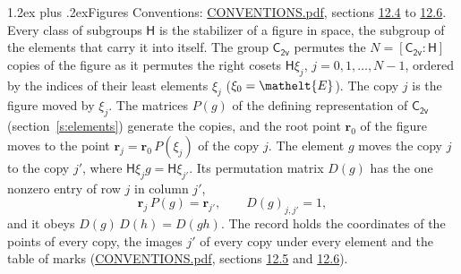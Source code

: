 \documentclass[10pt,a4paper]{article}
\makeatletter
\renewcommand\section{\@startsection{section}{1}{\z@}{-3ex plus -1ex minus -.2ex}%
  {1.2ex plus .2ex}{\normalfont\large\sffamily\bfseries\color{parttitle}}}
\numberwithin{equation}{section}
\newcommand{\eltfont}[1]{{\let\sigma\eltsigma\mathelt{#1}}}
\newcommand{\grp}[1]{\mathsf{#1}}
\newcommand{\cls}[1]{\eltfont{#1}}
\newcommand{\pointr}{\mathbf{r}}
\makeatother
\begin{document}
\section{Figures}\label{s:permutation}
Conventions: \href{../../CONVENTIONS.pdf}{CONVENTIONS.pdf}, sections \href{../../CONVENTIONS.pdf\#conv.12.4}{12.4} to \href{../../CONVENTIONS.pdf\#conv.12.6}{12.6}.
Every class of subgroups $\grp{H}$ is the stabilizer of a figure in space, the subgroup of the elements that carry it into itself. \label{n:local.orbit.size}\label{n:element.coset.least}\label{n:index.coset}The group $\grp{C_{2v}}$ permutes the $N = [\grp{C_{2v}} : \grp{H}]$ copies of the figure as it permutes the right cosets $\grp{H}\xi_j$, $j = 0, 1, \dots, N - 1$, ordered by the indices of their least elements $\xi_j$ ($\xi_0 = \cls{E}$). The copy $j$ is the figure moved by $\xi_j$. The matrices $P(g)$ of the defining representation of $\grp{C_{2v}}$ (section~\ref{s:elements}) generate the copies, and the root point $\pointr_0$ of the figure moves to the point $\pointr_j = \pointr_0\, P(\xi_j)$ of the copy $j$. \label{n:local.coset.image}The element $g$ moves the copy $j$ to the copy $j'$, where $\grp{H}\xi_j g = \grp{H}\xi_{j'}$. \label{n:local.matrix.permutation}Its permutation matrix $D(g)$ has the one nonzero entry of row $j$ in column $j'$,
\begin{equation}\label{e:perm.matrix}\pointr_j\, P(g) = \pointr_{j'}, \qquad D(g)_{j,j'} = 1,\end{equation}
and it obeys $D(g)\, D(h) = D(gh)$. The record holds the coordinates of the points of every copy, the images $j'$ of every copy under every element and the table of marks (\href{../../CONVENTIONS.pdf}{CONVENTIONS.pdf}, sections \href{../../CONVENTIONS.pdf\#conv.12.5}{12.5} and \href{../../CONVENTIONS.pdf\#conv.12.6}{12.6}).
\end{document}

